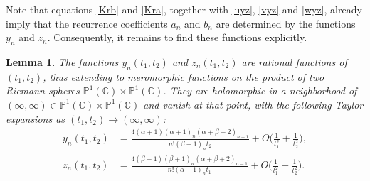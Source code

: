 \documentclass[10pt, reqno]{amsart}
\numberwithin{equation}{section}
\newtheorem{lemma}{Lemma}[section]
\numberwithin{equation}{section}
\begin{document}
Note that equations \eqref{Krb} and \eqref{Kra}, together with \eqref{uyz}, \eqref{vyz} and \eqref{wyz}, already imply that the recurrence coefficients $a_n$ and $b_n$ are determined by the functions $y_n$ and $z_n$. Consequently, it remains to find these functions explicitly. 
\begin{lemma} \label{lemma 5.2}
The functions $y_n(t_1,t_2)$ and $z_n(t_1,t_2)$ are rational functions of $(t_1, t_2)$, thus extending to meromorphic functions on the product of two Riemann spheres $\mathbb{P}^1(\mathbb{C})\times \mathbb{P}^1(\mathbb{C})$. They are holomorphic in a neighborhood of $(\infty,\infty)\in \mathbb{P}^1(\mathbb{C})\times \mathbb{P}^1(\mathbb{C})$ and vanish at that point, with the following Taylor expansions as $(t_1,t_2)\to (\infty, \infty)$: 
\begin{align}
y_n(t_1,t_2)&=\frac{4(\alpha+1)(\alpha+1)_n(\alpha+\beta+2)_{n-1}}{n!(\beta+1)_n t_2}+O\Big(\frac{1}{t_1^2}+\frac{1}{t_2^2}\Big), \label{aKy}\\
z_n(t_1,t_2)&=\frac{4(\beta+1)(\beta+1)_n(\alpha+\beta+2)_{n-1}}{n!(\alpha+1)_n t_1}+O\Big(\frac{1}{t_1^2}+\frac{1}{t_2^2}\Big) .\label{aKz}
\end{align}
\end{lemma}
\end{document}
